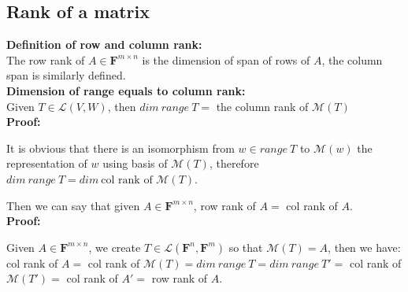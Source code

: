 \documentclass{article}
\begin{document}
\subsection{Rank of a matrix}
\textbf{Definition of row and column rank:}\\
The row rank of $A \in \mathbf{F}^{m \times n}$ is the dimension of span of rows of $A$, the column span is similarly defined.\\
\textbf{Dimension of range equals to column rank:}\\
Given $T \in \mathcal{L}(V, W)$, then $dim\ range\ T = $ the column rank of $\mathcal{M}(T)$\\
\textbf{Proof:}
\begin{addmargin}[1em]{0em}
It is obvious that there is an isomorphism from $w \in range\ T$ to $\mathcal{M}(w)$ the representation of $w$ using basis of $\mathcal{M}(T)$, therefore $dim\ range\ T = dim\ \textrm{col rank of } \mathcal{M}(T)$.
\end{addmargin}
Then we can say that given $A \in \textbf{F}^{m \times n}$, row rank of $A =$ col rank of $A$.\\
\textbf{Proof:}
\begin{addmargin}[1em]{0em}
Given $A \in \textbf{F}^{m \times n}$, we create $T \in \mathcal{L}(\textbf{F}^n, \textbf{F}^m)$ so that $\mathcal{M}(T) = A$, then we have:\\
col rank of $A =$ col rank of $\mathcal{M}(T) = dim\ range\ T = dim\ range\ T' =$ col rank of $\mathcal{M}(T') =$ col rank of $A' =$ row rank of $A$.
\end{addmargin}
\end{document}
